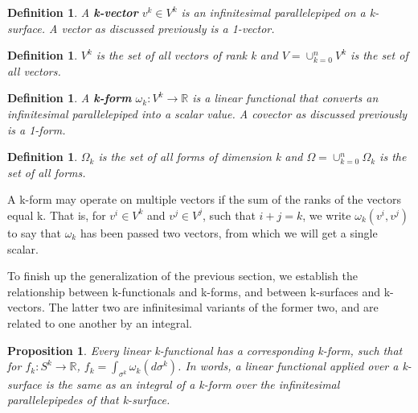 \documentclass{book}
\newtheorem{defn}[equation]{Definition}
\newtheorem{prop}[equation]{Proposition}
\begin{document}
\begin{defn}
	A \textbf{k-vector} $v^k \in V^k$ is an infinitesimal parallelepiped on a k-surface. A vector as discussed previously is a 1-vector. 
\end{defn}


\begin{defn}
	$V^k$ is the set of all vectors of rank k and $V = \cup_{k=0}^n V^k$ is the set of all vectors. 
	\end{defn}
 

\begin{defn}
	A \textbf{k-form} $\omega_k : V^k \to \mathbb{R}$ is a linear functional that converts an infinitesimal parallelepiped into a scalar value. A covector as discussed previously is a 1-form. 
\end{defn}

\begin{defn}
	$\Omega_k$ is the set of all forms of dimension k and $\Omega = \cup_{k=0}^n\Omega_k$ is the set of all forms. 
\end{defn}

A k-form may operate on multiple vectors if the sum of the ranks of the vectors equal k. That is, for $v^i \in V^k$ and $v^j \in V^j$, such that $i + j = k$, we write $\omega_k(v^i, v^j)$ to say that $\omega_k$ has been passed two vectors, from which we will get a single scalar. 




To finish up the generalization of the previous section, we establish the relationship between k-functionals and k-forms, and between k-surfaces and k-vectors. The latter two are infinitesimal variants of the former two, and are related to one another by an integral. 


\begin{prop}
	Every linear k-functional has a corresponding k-form, such that for $f_k : S^k \to \mathbb{R}$, $f_k = \int_{\sigma^k} \omega_k(d\sigma^k)$. In words, a linear functional applied over a k-surface is the same as an integral of a k-form over the infinitesimal parallelepipedes of that k-surface. 
\end{prop}
\end{document}
